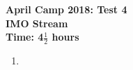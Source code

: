 \documentclass[a4paper,12pt]{article}
\begin{document}
\setcounter{page}{1}

\begin{center}
	\textbf{April Camp 2018: Test 4}\\
	\textbf{IMO Stream}\\
	\textbf{Time: 4$\frac{1}{2}$ hours}
\end{center}

\begin{enumerate}
\vspace{0.2cm}

\item 

\end{enumerate}
\end{document}

